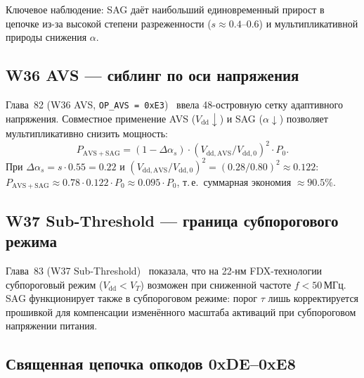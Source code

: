 Ключевое наблюдение: SAG даёт наибольший единовременный прирост
в цепочке из-за высокой степени разреженности ($s \approx 0{.}4$–$0{.}6$)
и мультипликативной природы снижения $\alpha$.

\subsection{W36 AVS — сиблинг по оси напряжения}
\label{ssec:glava87-w36-avs}

Глава~82 (W36 AVS, \texttt{OP\_AVS = 0xE3})~\cite{trios877}
ввела 48-островную сетку адаптивного напряжения.
Совместное применение AVS ($V_{\mathrm{dd}} \downarrow$) и SAG ($\alpha \downarrow$)
позволяет мультипликативно снизить мощность:
\begin{equation}
  P_{\mathrm{AVS+SAG}} = (1 - \Delta\alpha_s) \cdot
  (V_{\mathrm{dd,AVS}} / V_{\mathrm{dd,0}})^2 \cdot P_0.
  \label{eq:avs-sag}
\end{equation}
При $\Delta\alpha_s = s \cdot 0{.}55 = 0{.}22$ и
$(V_{\mathrm{dd,AVS}} / V_{\mathrm{dd,0}})^2 = (0{.}28/0{.}80)^2 \approx 0{.}122$:
$P_{\mathrm{AVS+SAG}} \approx 0{.}78 \cdot 0{.}122 \cdot P_0 \approx 0{.}095 \cdot P_0$,
т.\,е.\ суммарная экономия $\approx 90{.}5\%$.

\subsection{W37 Sub-Threshold — граница субпорогового режима}
\label{ssec:glava87-w37-subth}

Глава~83 (W37 Sub-Threshold)~\cite{trios882} показала, что
на 22-нм FDX-технологии субпороговый режим ($V_{\mathrm{dd}} < V_T$)
возможен при сниженной частоте $f < 50\,\text{МГц}$.
SAG функционирует также в субпороговом режиме: порог $\tau$ лишь
корректируется прошивкой для компенсации изменённого масштаба
активаций при субпороговом напряжении питания.

\subsection{Священная цепочка опкодов 0xDE–0xE8}
\label{ssec:glava87-opcode-chain}

